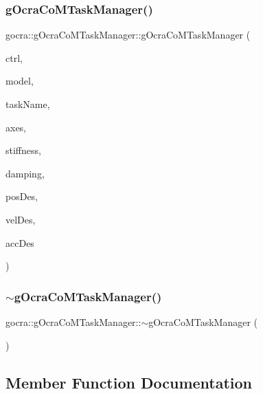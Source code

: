 \subsubsection{\texorpdfstring{g\+Ocra\+Co\+M\+Task\+Manager()}{gOcraCoMTaskManager()}\hspace{0.1cm}{\footnotesize\ttfamily [3/3]}}
{\footnotesize\ttfamily gocra\+::g\+Ocra\+Co\+M\+Task\+Manager\+::g\+Ocra\+Co\+M\+Task\+Manager (\begin{DoxyParamCaption}\item[{\hyperlink{classgocra_1_1GHCJTController}{G\+H\+C\+J\+T\+Controller} \&}]{ctrl,  }\item[{const \hyperlink{classocra_1_1Model}{ocra\+::\+Model} \&}]{model,  }\item[{const std\+::string \&}]{task\+Name,  }\item[{\hyperlink{namespaceocra_a436781c7059a0f76027df1c652126260}{ocra\+::\+E\+Cartesian\+Dof}}]{axes,  }\item[{double}]{stiffness,  }\item[{double}]{damping,  }\item[{Eigen\+::\+Vector3d}]{pos\+Des,  }\item[{Eigen\+::\+Vector3d}]{vel\+Des,  }\item[{Eigen\+::\+Vector3d}]{acc\+Des }\end{DoxyParamCaption})}

\hypertarget{classgocra_1_1gOcraCoMTaskManager_ae1de7bee1de0ccd0b904baccdd4ca9c0}{}\label{classgocra_1_1gOcraCoMTaskManager_ae1de7bee1de0ccd0b904baccdd4ca9c0} 
\subsubsection{\texorpdfstring{$\sim$g\+Ocra\+Co\+M\+Task\+Manager()}{~gOcraCoMTaskManager()}}
{\footnotesize\ttfamily gocra\+::g\+Ocra\+Co\+M\+Task\+Manager\+::$\sim$g\+Ocra\+Co\+M\+Task\+Manager (\begin{DoxyParamCaption}{ }\end{DoxyParamCaption})}



\subsection{Member Function Documentation}
\hypertarget{classgocra_1_1gOcraCoMTaskManager_a0a2649bf8ce377a8af44e13a3571f670}{}\label{classgocra_1_1gOcraCoMTaskManager_a0a2649bf8ce377a8af44e13a3571f670} 
